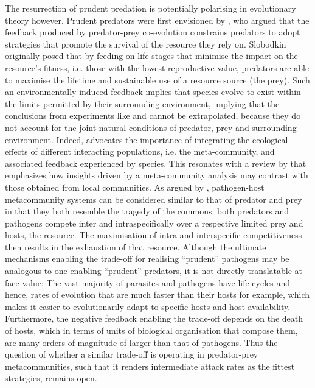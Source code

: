 \documentclass[a4paper]{report}
\begin{document}
 The resurrection of prudent predation is potentially polarising in evolutionary theory however. Prudent predators were first envisioned by \citep{Slobodkin1968}, who argued that the feedback produced by predator-prey co-evolution constrains predators to adopt strategies that promote the survival of the resource they rely on. Slobodkin originally posed that by feeding on life-stages that minimise the impact on the resource's fitness, i.e. those with the lowest reproductive value, predators are able to maximise the lifetime and sustainable use of a resource source (the prey). Such an environmentally induced feedback implies that species evolve to exist within the limits permitted by their surrounding environment, implying that the conclusions from experiments like \citep{gausse1934} and \citep{Gause1936} cannot be extrapolated, because they do not account for the joint natural conditions of predator, prey and surrounding environment. Indeed, \citep{Goodnight2008} advocates the importance of integrating the ecological effects of different interacting populations, i.e. the meta-community, and associated feedback experienced by species. This resonates with a review by \citep{Leibold2004} that emphasizes how insights driven by a meta-community analysis may contrast with those obtained from local communities. As argued by \citep{Goodnight2008}, pathogen-host metacommunity systems can be considered similar to that of predator and prey in that they both resemble the tragedy of the commons: both predators and pathogens compete inter and intraspecifically over a respective limited prey and hosts, the resource. The maximisation of intra and interspecific competitiveness then results in the exhaustion of that resource. Although the ultimate mechanisms enabling the trade-off for realising “prudent” pathogens may be analogous to one enabling “prudent” predators, it is not directly translatable at face value: The vast majority of parasites and pathogens have life cycles and hence, rates of evolution that are much faster than their hosts for example, which makes it easier to evolutionarily adapt to specific hosts and host availability. Furthermore, the negative feedback enabling the trade-off depends on the death of hosts, which in terms of units of biological organisation that compose them, are many orders of magnitude of larger than that of pathogens. Thus the question of whether a similar trade-off is operating in predator-prey metacommunities, such that it renders intermediate attack rates as the fittest strategies, remains open.\\
\end{document}
